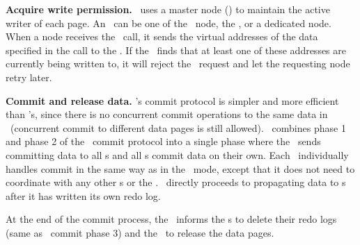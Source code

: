 {\bf Acquire write permission.}
\hotpot\ uses a master node ({\em \master}) to maintain the active writer of each page. 
An \master\ can be one of the \hotpot\ node, the \cd, or a dedicated node.
When a node receives the \acquire\ call, it sends the virtual addresses of the data specified in the call to the \master.
If the \master\ finds that at least one of these addresses are currently being written to, 
it will reject the \acquire\ request and let the requesting node retry later.

{\bf Commit and release data.}
\mrsw's commit protocol is simpler and more efficient than \mrmw's,
since there is no concurrent commit operations to the same data in \mrsw\ (concurrent commit to different data pages is still allowed).
\mrsw\ combines phase 1 and phase 2 of the \mrmw\ commit protocol into a single phase 
where the \xn\ sends committing data to all \on{}s and all \on{}s commit data on their own.
Each \on\ individually handles commit in the same way as in the \mrmw\ mode, 
except that it does not need to coordinate with any other \on{}s or the \xn. 
\on\ directly proceeds to propagating data to \dn{}s after it has written its own redo log.

At the end of the commit process, the \xn\ informs the \on{}s to delete their redo logs (same as \mrmw\ commit phase 3)
and the \master\ to release the data pages.


